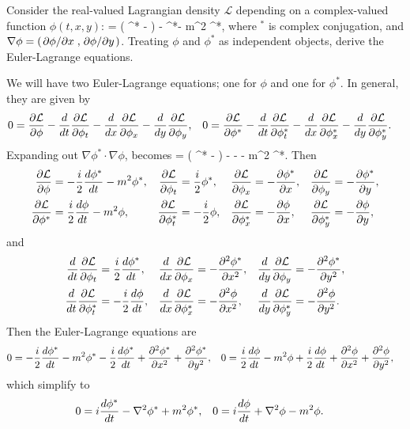 \newcommand{\lap}{\nabla^2}
\newcommand{\Ld}{\mathcal{L}}
\newcommand{\phis}{\phi^*}

\newcommand{\phit}{\phi_t}
\newcommand{\phix}{\phi_x}
\newcommand{\phiy}{\phi_y}

\newcommand{\phist}{\phis_t}
\newcommand{\phisx}{\phis_x}
\newcommand{\phisy}{\phis_y}

\begin{statement}{}
	Consider the real-valued Lagrangian density $\Ld$ depending on a complex-valued function $\phi(t, x, y)$:
	\beqn \label{lagr2}
		\Ld =  \left( \phis {} - \dv{\phis}{t} \phi \right) - \nabla \phis \cdot \nabla \phi - m^2 \phis \phi,
	\eeqn
	where $^*$ is complex conjugation, and $\nabla \phi = (\pdv*{\phi}{x}, \pdv*{\phi}{y})$.  Treating $\phi$ and $\phis$ as independent objects, derive the Euler-Lagrange equations.
\end{statement}

\begin{solution}
	We will have two Euler-Lagrange equations; one for $\phi$ and one for $\phis$.  In general, they are given by
	\begin{align*}
		0 &= \pdv{\Ld}{\phi} - \dv{}{t} \pdv{\Ld}{\phit} - \dv{}{x} \pdv{\Ld}{\phix} - \dv{}{y} \pdv{\Ld}{\phiy}, &
		0 &= \pdv{\Ld}{\phis} - \dv{}{t} \pdv{\Ld}{\phist} - \dv{}{x} \pdv{\Ld}{\phisx} - \dv{}{y} \pdv{\Ld}{\phisy}.
	\end{align*}
	Expanding out $\nabla \phis \cdot \nabla \phi$,  becomes
	\beq
		\Ld =  \left( \phis {} - \dv{\phis}{t} \phi \right) - \pdv{\phis}{x}  - \pdv{\phis}{y}  - m^2 \phis \phi.
	\eeq
	Then
	\begin{align*}
		\pdv{\Ld}{\phi} &= -\frac{i}{2} \dv{\phis}{t} - m^2 \phis, &
		\pdv{\Ld}{\phit} &= \frac{i}{2} \phis, &
		\pdv{\Ld}{\phix} &= -\pdv{\phis}{x}, &
		\pdv{\Ld}{\phiy} &= -\pdv{\phis}{y}, \\
		\pdv{\Ld}{\phis} &= \frac{i}{2} \dv{\phi}{t} - m^2 \phi, &
		\pdv{\Ld}{\phist} &= -\frac{i}{2} \phi, &
		\pdv{\Ld}{\phisx} &= -\pdv{\phi}{x}, &
		\pdv{\Ld}{\phisy} &= -\pdv{\phi}{y},
	\end{align*}
	and
	\begin{align*}
		\dv{}{t} \pdv{\Ld}{\phit} &= \frac{i}{2} \dv{\phis}{t}, &
		\dv{}{x} \pdv{\Ld}{\phix} &= -\pdv[2]{\phis}{x}, &
		\dv{}{y} \pdv{\Ld}{\phiy} &= -\pdv[2]{\phis}{y}, \\
		\dv{}{t} \pdv{\Ld}{\phist} &= -\frac{i}{2} \dv{\phi}{t}, &
		\dv{}{x} \pdv{\Ld}{\phisx} &= -\pdv[2]{\phi}{x}, &
		\dv{}{y} \pdv{\Ld}{\phisy} &= -\pdv[2]{\phi}{y}.
	\end{align*}
	Then the Euler-Lagrange equations are
	\begin{align*}
		0 &= -\frac{i}{2} \dv{\phis}{t} - m^2 \phis - \frac{i}{2} \dv{\phis}{t} + \pdv[2]{\phis}{x} + \pdv[2]{\phis}{y}, &
		0 &= \frac{i}{2} \dv{\phi}{t} - m^2 \phi + \frac{i}{2} \dv{\phi}{t} + \pdv[2]{\phi}{x} + \pdv[2]{\phi}{y},
	\end{align*}
	which simplify to
	\begin{align*}
		0 &= i \dv{\phis}{t} - \lap \phis + m^2 \phis, &
		0 &= i \dv{\phi}{t} + \lap \phi - m^2 \phi.
	\end{align*}
\vfix
\end{solution}